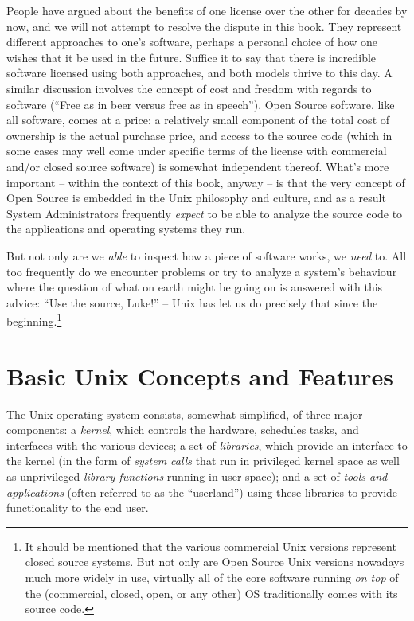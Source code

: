 People have argued about the benefits of one license
over the other for decades by now, and we will not
attempt to resolve the dispute in this book.  They
represent different approaches to one's software,
perhaps a personal choice of how one wishes that it be
used in the future.  Suffice it to say that there is
incredible software licensed using both approaches,
and both models thrive to this day.  A similar
discussion involves the concept of cost and freedom
with regards to software (``Free as in beer versus
free as in speech'').  Open Source software, like all
software, comes at a price: a relatively small
component of the total cost of ownership is the actual
purchase price, and access to the source code (which
in some cases may well come under specific terms of
the license with commercial and/or closed source
software) is somewhat independent thereof.  What's
more important -- within the context of this book,
anyway -- is that the very concept of Open Source is
embedded in the Unix philosophy and culture, and as a
result System Administrators frequently {\em expect}
to be able to analyze the source code to the
applications and operating systems they run.

But not only are we {\em able} to inspect how a piece
of software works, we {\em need} to.  All too
frequently do we encounter problems or try to analyze
a system's behaviour where the question of what on
earth might be going on is answered with this advice:
``Use the source, Luke!'' -- Unix has let us do
precisely that since the beginning.\footnote{It should
be mentioned that the various commercial Unix versions
represent closed source systems.  But not only are
Open Source Unix versions nowadays much more widely in
use, virtually all of the core software running {\em
on top} of the (commercial, closed, open, or any
other) OS traditionally comes with its source code.}


\section{Basic Unix Concepts and Features}
\label{unix:basics}

The Unix operating system consists, somewhat
simplified, of three major components: a {\em kernel},
which controls the hardware, schedules tasks, and
interfaces with the various devices; a set of {\em
libraries}, which provide an interface to the kernel
(in the form of {\em  system calls} that run in privileged kernel space as well as
unprivileged {\em library functions} running in user
space); and a set of {\em tools and applications}
(often referred to as the ``userland'') using these
libraries to provide functionality to the end user.

